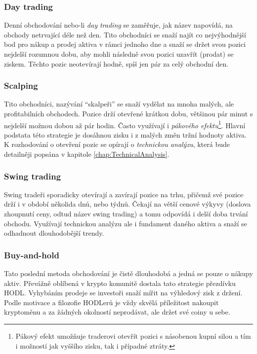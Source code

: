 \subsubsection{Day trading}
Denní obchodování nebo-li \emph{day trading} se zaměřuje, jak název napovídá, na obchody netrvající déle než den. Tito obchodníci se snaží najít co nejvýhodnější
bod pro nákup a prodej aktiva v rámci jednoho dne a snaží se držet svou pozici nejdelší rozumnou dobu, aby mohli následně svou pozici uzavřít (prodat) se ziskem.
Těchto pozic neotevírají hodně, spíš jen pár za celý obchodní den.

\subsubsection{Scalping}
\label{subsubsec:scalping}
Tito obchodníci, nazývání \enquote{skalpeři} se snaží vydělat na mnoha malých, ale profitabilních obchodech. Pozice drží otevřené krátkou dobu, většinou pár minut
s nejdelší možnou dobou až pár hodin. Často využívají i \emph{pákového efektu}\footnote{Pákový efekt umožňuje traderovi otevřít pozici s násobenou kupní silou
    a tím i možností jak vyššího zisku, tak i případné ztráty.}. Hlavní podstata této strategie je dosáhnou zisku i z malých změn tržní hodnoty aktiva.
K rozhodování o otevření pozic se opírají o \emph{technickou analýzu}, která bude detailněji popsána v kapitole \ref{chap:TechnicalAnalysis}.

\subsubsection{Swing trading}
Swing tradeři sporadicky otevírají a zavírají pozice na trhu, přičemž své pozice drží i v období několida dnů, nebo týdnů. Čekají na větší cenové
výkyvy (doslova zhoupnutí ceny, odtud název swing trading) a tomu odpovídá i delší doba trvání obchodu. Využívají technickou analýzu ale i fundament
daného aktiva a snaží se odhadnout dlouhodobější trendy.

\subsubsection{Buy-and-hold}
Tato poslední metoda obchodování je čistě dlouhodobá a jedná se pouze o nákupy aktiv. Převážně oblíbená v krypto komunitě dostala tato strategie přezdívku HODL.
Vyhybáním prodeje se investoři snaží mířit na výhledový zisk z držení. Podle motivace a filozofie HODLerů je vždy skvělá příležitost nakoupit kryptoměnu a za
žádných okolností neprodávat, ale držet své coiny u sebe.

\endinput